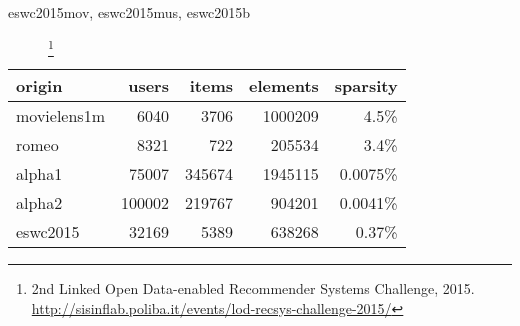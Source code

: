 \begin{description}
    \item[eswc2015mov, eswc2015mus, eswc2015b]

        \footnote{2nd Linked Open Data-enabled Recommender Systems Challenge, 2015. \url{http://sisinflab.poliba.it/events/lod-recsys-challenge-2015/}}




\end{description}

\begin{table}
\centering
\begin{tabular}{| l | r | r | r | r |}
    \hline
    origin      &   users   & items     & elements  & sparsity  \\ \hline

    movielens1m &   6040    & 3706      & 1000209   & 4.5\%     \\ \hline
    romeo       &   8321    & 722       & 205534    & 3.4\%     \\ \hline
    alpha1      &   75007   & 345674    & 1945115   & 0.0075\%  \\ \hline
    alpha2      &   100002  & 219767    & 904201    & 0.0041\%  \\ \hline
    eswc2015    &   32169   & 5389      & 638268    & 0.37\%    \\ \hline

\end{tabular}
\end{table}

